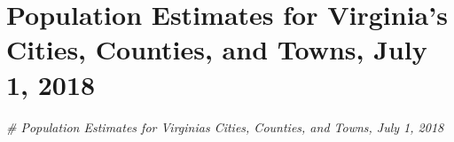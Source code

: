 \documentclass[
]{book}
\newenvironment{Shaded}{\begin{snugshade}}{\end{snugshade}}
\newcommand{\CommentTok}[1]{\textcolor[rgb]{0.56,0.35,0.01}{\textit{#1}}}
\begin{document}
\hypertarget{population-estimates-for-virginias-cities-counties-and-towns-july-1-2018}{%
\chapter{Population Estimates for Virginia's Cities, Counties, and Towns, July 1, 2018}\label{population-estimates-for-virginias-cities-counties-and-towns-july-1-2018}}

\begin{Shaded}
\begin{Highlighting}[]
\CommentTok{\# Population Estimates for Virginia\textquotesingle{}s Cities, Counties, and Towns, July 1, 2018}
\end{Highlighting}
\end{Shaded}


  
\end{document}
